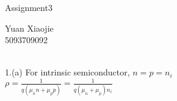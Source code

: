 \documentclass[11pt,oneside,a4paper]{article}
\begin{document}
\begin{center}Assignment3\\\end{center}
\begin{flushright}Yuan Xiaojie\\5093709092\\\end{flushright}

\ \\

1.\:(a) For intrinsic semiconductor, \(n=p=n_i\) \\

\hspace{8.5mm} \(\rho=\frac{1}{q(\mu_nn+\mu_pp)}=\frac{1}{q(\mu_n+\mu_p)n_i}\) \\

\hspace{8.5mm} \(\) \\
\hspace{8.5mm} \(\) \\
\hspace{8.5mm} \(\) \\
\hspace{8.5mm} \(\) \\
\hspace{8.5mm} \(\) \\
\hspace{8.5mm} \(\) \\
\hspace{8.5mm} \(\) \\
\hspace{8.5mm} \(\) \\
\hspace{8.5mm} \(\) \\
\hspace{8.5mm} \(\) \\
\hspace{8.5mm} \(\) \\
\hspace{8.5mm} \(\) \\
\end{document}
